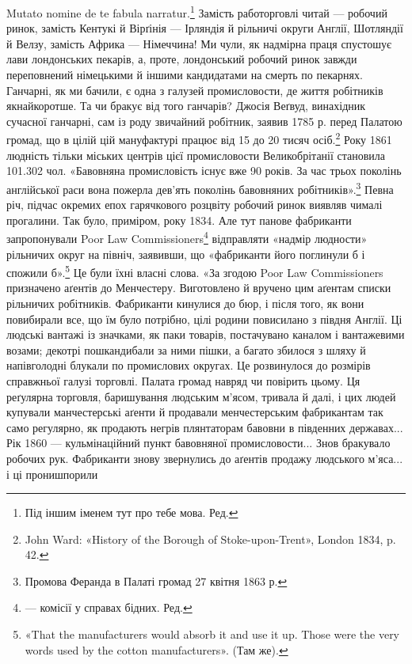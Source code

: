 Mutato nomine de te fabula narratur.\footnote*{
Під іншим іменем тут про тебе мова. Ред.
}  Замість работорговлі
читай — робочий ринок, замість Кентукі й Вірґінія — Ірляндія
й рільничі округи Англії, Шотляндії й Велзу, замість Африка —
Німеччина! Ми чули, як надмірна праця спустошує лави лондонських
пекарів, а, проте, лондонський робочий ринок завжди
переповнений німецькими й іншими кандидатами на смерть по
пекарнях. Ганчарні, як ми бачили, є одна з галузей промисловости,
де життя робітників якнайкоротше. Та чи бракує від того ганчарів?
Джосія Веґвуд, винахідник сучасної ганчарні, сам із роду
звичайний робітник, заявив 1785 р. перед Палатою громад,
що в цілій цій мануфактурі працює від 15 до 20 тисяч осіб.\footnote{
John Ward: «History of the Borough of Stoke-upon-Trent», London
1834, p. 42.
}
Року 1861 людність тільки міських центрів цієї промисловости
Великобрітанії становила 101.302 чол. «Бавовняна промисловість
існує вже 90 років. За час трьох поколінь англійської раси
вона пожерла дев’ять поколінь бавовняних робітників».\footnote{
Промова Феранда в Палаті громад 27 квітня 1863 р.
}
Певна річ, підчас окремих епох гарячкового розцвіту робочий
ринок виявляв чималі прогалини. Так було, приміром, року 1834.
Але тут панове фабриканти запропонували Poor Law Commissioners\footnote*{
— комісії у справах бідних. Ред.
}
відправляти «надмір людности» рільничих округ на північ,
заявивши, що «фабриканти його поглинули б і спожили б».\footnote{
«That the manufacturers would absorb it and use it up. Those were
the very words used by the cotton manufacturers». (Там же).
}
Це були їхні власні слова. «За згодою Poor Law Commissioners
призначено аґентів до Менчестеру. Виготовлено й вручено цим
аґентам списки рільничих робітників. Фабриканти кинулися до
бюр, і після того, як вони повибирали все, що їм було потрібно,
цілі родини повисилано з півдня Англії. Ці людські вантажі із
значками, як паки товарів, постачувано каналом і вантажевими
возами; декотрі пошкандибали за ними пішки, а багато збилося
з шляху й напівголодні блукали по промислових округах. Це розвинулося
до розмірів справжньої галузі торговлі. Палата громад
навряд чи повірить цьому. Ця реґулярна торговля, баришування
людським м’ясом, тривала й далі, і цих людей купували манчестерські
аґенти й продавали менчестерським фабрикантам так
само регулярно, як продають негрів плянтаторам бавовни в південних
державах... Рік 1860 — кульмінаційний пункт бавовняної
промисловости... Знов бракувало робочих рук. Фабриканти
знову звернулись до аґентів продажу людського м’яса... і ці пронишпорили

